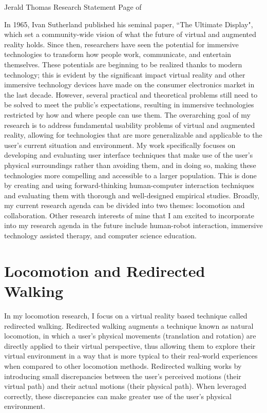 \newpage

\setcounter{page}{1}
\makecvfooter
  {Jerald Thomas}
  {Research Statement}
  {Page \thepage \hspace{1pt} of \pageref{research_last}}


\makecvheader[C]


In 1965, Ivan Sutherland published his seminal paper, ``The Ultimate Display", which set a community-wide vision of what the future of virtual and augmented reality holds. Since then, researchers have seen the potential for immersive technologies to transform how people work, communicate, and entertain themselves. These potentials are beginning to be realized thanks to modern technology; this is evident by the significant impact virtual reality and other immersive technology devices have made on the consumer electronics market in the last decade. However, several practical and theoretical problems still need to be solved to meet the public’s expectations, resulting in immersive technologies restricted by how and where people can use them. The overarching goal of my research is to address fundamental usability problems of virtual and augmented reality, allowing for technologies that are more generalizable and applicable to the user's current situation and environment. My work specifically focuses on developing and evaluating user interface techniques that make use of the user's physical surroundings rather than avoiding them, and in doing so, making these technologies more compelling and accessible to a larger population. This is done by creating and using forward-thinking human-computer interaction techniques and evaluating them with thorough and well-designed empirical studies. Broadly, my current research agenda can be divided into two themes: locomotion and collaboration. Other research interests of mine that I am excited to incorporate into my research agenda in the future include human-robot interaction, immersive technology assisted therapy, and computer science education.

\section*{Locomotion and Redirected Walking}
\vspace{-0.25cm}

In my locomotion research, I focus on a virtual reality based technique called redirected walking. Redirected walking augments a technique known as natural locomotion, in which a user's physical movements (translation and rotation) are directly applied to their virtual perspective, thus allowing them to explore their virtual environment in a way that is more typical to their real-world experiences when compared to other locomotion methods. Redirected walking works by introducing small discrepancies between the user's perceived motions (their virtual path) and their actual motions (their physical path). When leveraged correctly, these discrepancies can make greater use of the user's physical environment.

